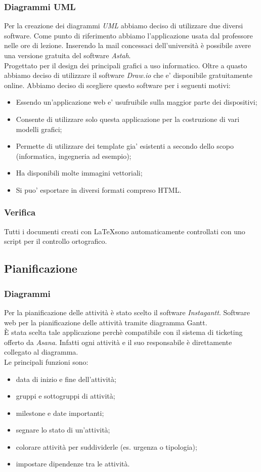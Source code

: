 \documentclass[12pt,a4paper,titlepage]{article}
\begin{document}
\subsubsection{Diagrammi UML}
Per la creazione dei diagrammi \textit{UML} abbiamo deciso di utilizzare due diversi software. Come punto di riferimento abbiamo l'applicazione usata dal professore nelle ore di lezione. Inserendo la mail concessaci dell'università è possibile avere una versione gratuita del software \textit{Astah}.\\
Progettato per il design dei principali grafici a uso informatico. Oltre a quasto abbiamo deciso di utilizzare il software \textit{Draw.io} che e' disponibile gratuitamente online. Abbiamo deciso di scegliere questo software per i seguenti motivi:
	\begin{itemize}
		\item Essendo un'applicazione web e' usufruibile sulla maggior parte dei dispositivi;
		\item Consente di utilizzare solo questa applicazione per la costruzione di vari modelli grafici;
		\item Permette di utilizzare dei template gia' esistenti a secondo dello scopo (informatica, ingegneria ad esempio);
		\item Ha disponibili molte immagini vettoriali;
		\item Si puo' esportare in diversi formati compreso HTML.
	\end{itemize}	 
\subsubsection{Verifica}
Tutti i documenti creati con \LaTeX sono automaticamente controllati con uno script per il controllo ortografico.
\subsection{Pianificazione}
\subsubsection{Diagrammi}
Per la pianificazione delle attività è stato scelto il software \textit{Instagantt}. Software web per la pianificazione delle attività tramite diagramma Gantt. \\
È stata scelta tale applicazione perchè compatibile con il sistema di ticketing offerto da \textit{Asana}. Infatti ogni attività e il suo responsabile è direttamente collegato al diagramma. \\
Le principali funzioni sono:
\begin{itemize}
	\item data di inizio e fine dell'attività;
	\item gruppi e sottogruppi di attività;
	\item milestone e date importanti;
	\item segnare lo stato di un'attività;
	\item colorare attività per suddividerle (es. urgenza o tipologia);
	\item impostare dipendenze tra le attività.
\end{itemize}
\end{document}
